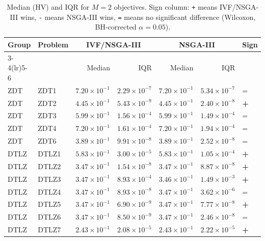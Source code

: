 \begin{table}[t]
\centering
\caption{Median (HV) and IQR for $M=2$ objectives. Sign column: \texttt{+} means IVF/NSGA-III wins, \texttt{-} means NSGA-III wins, \texttt{=} means no significant difference (Wilcoxon, BH-corrected $\alpha=0.05$).}
\label{tab:hv_m2_ivfnsga-iii}
\scriptsize
\begin{tabular}{llrrrrl}
\toprule
Group & Problem & \multicolumn{2}{c}{IVF/NSGA-III} & \multicolumn{2}{c}{NSGA-III} & Sign \\
\cmidrule(lr){3-4}\cmidrule(lr){5-6}
 & & Median & IQR & Median & IQR & \\
\midrule
ZDT & ZDT1 & $7.20\!\times\!10^{-1}$ & $2.29\!\times\!10^{-7}$ & $7.20\!\times\!10^{-1}$ & $5.34\!\times\!10^{-7}$ & = \\
ZDT & ZDT2 & $4.45\!\times\!10^{-1}$ & $5.43\!\times\!10^{-9}$ & $4.45\!\times\!10^{-1}$ & $2.40\!\times\!10^{-8}$ & \textbf{+} \\
ZDT & ZDT3 & $5.99\!\times\!10^{-1}$ & $1.56\!\times\!10^{-4}$ & $5.99\!\times\!10^{-1}$ & $1.49\!\times\!10^{-4}$ & = \\
ZDT & ZDT4 & $7.20\!\times\!10^{-1}$ & $1.61\!\times\!10^{-4}$ & $7.20\!\times\!10^{-1}$ & $1.94\!\times\!10^{-4}$ & = \\
ZDT & ZDT6 & $3.89\!\times\!10^{-1}$ & $9.91\!\times\!10^{-8}$ & $3.89\!\times\!10^{-1}$ & $2.52\!\times\!10^{-8}$ & = \\
\addlinespace
DTLZ & DTLZ1 & $5.83\!\times\!10^{-1}$ & $3.00\!\times\!10^{-5}$ & $5.83\!\times\!10^{-1}$ & $1.05\!\times\!10^{-4}$ & \textbf{+} \\
DTLZ & DTLZ2 & $3.47\!\times\!10^{-1}$ & $1.54\!\times\!10^{-8}$ & $3.47\!\times\!10^{-1}$ & $8.87\!\times\!10^{-8}$ & \textbf{+} \\
DTLZ & DTLZ3 & $3.47\!\times\!10^{-1}$ & $8.93\!\times\!10^{-4}$ & $3.46\!\times\!10^{-1}$ & $1.49\!\times\!10^{-3}$ & \textbf{+} \\
DTLZ & DTLZ4 & $3.47\!\times\!10^{-1}$ & $8.93\!\times\!10^{-8}$ & $3.47\!\times\!10^{-1}$ & $3.62\!\times\!10^{-6}$ & = \\
DTLZ & DTLZ5 & $3.47\!\times\!10^{-1}$ & $6.90\!\times\!10^{-9}$ & $3.47\!\times\!10^{-1}$ & $7.77\!\times\!10^{-8}$ & \textbf{+} \\
DTLZ & DTLZ6 & $3.47\!\times\!10^{-1}$ & $8.50\!\times\!10^{-9}$ & $3.47\!\times\!10^{-1}$ & $2.46\!\times\!10^{-8}$ & = \\
DTLZ & DTLZ7 & $2.43\!\times\!10^{-1}$ & $2.08\!\times\!10^{-5}$ & $2.43\!\times\!10^{-1}$ & $2.22\!\times\!10^{-5}$ & \textbf{+} \\

\end{tabular}
\end{table}
